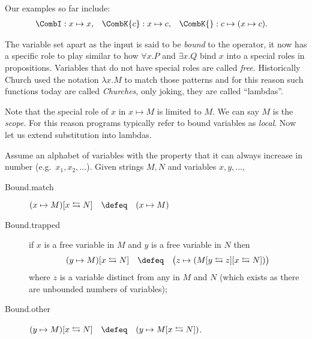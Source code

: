 Our examples so far include:
\begin{align*}
    \CombI:x & \mapsto x, &
    \CombK{c}:x & \mapsto c, &
    \CombK{}: c & \mapsto (x\mapsto c).
\end{align*}



The variable set apart as the input is said to
be \emph{bound} to the operator, it now has a specific role to play similar to
how $\forall x.P$  and $\exists x.Q$ bind $x$ into a special roles in propositions.
Variables that do not have special roles are called \emph{free}.  
Historically Church used the notation $\lambda x.M$ to match those 
patterns and for this reason such functions today are called \emph{Churches}, 
only joking, they are called ``lambdas''. 

Note that the special role of $x$ in $x\mapsto M$ is limited to $M$.  We can say
$M$ is the \emph{scope}.   For this reason programs typically refer to bound
variables as \emph{local}.  Now let us extend substitution into lambdas.
\begin{definition}
    Assume an alphabet of variables with the property that it can always increase in number
    (e.g.\ $x_1, x_2,\ldots$).
Given strings $M,N$ and variables $x,y,\ldots$,
\begin{description}
    \item[Bound.match] $(x\mapsto M)[x\leftrightarrows N]\quad \defeq\quad (x\mapsto M)$
    \item[Bound.trapped]
    if $x$ is a free variable in $M$ and $y$ is a free variable in $N$ then 
    \[ 
        (y\mapsto M)[x\leftrightarrows N]
        \quad \defeq\quad 
        \bigl(z\mapsto (M[y\leftrightarrows z][x\leftrightarrows N])\bigr)
    \]
    where 
    $z$ is a variable distinct from any in $M$ and $N$ (which exists 
    as there are unbounded numbers of variables);

    \item[Bound.other] $(y\mapsto M)[x\leftrightarrows N]\quad \defeq\quad 
    (y\mapsto M[x\leftrightarrows N])$.
\end{description}
\end{definition}

